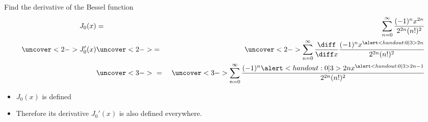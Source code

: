 \begin{frame}
\begin{example}[Example 4, p. 766]
Find the derivative of the Bessel function
\abovedisplayskip=0pt
\belowdisplayskip=0pt
\begin{eqnarray*}
J_0(x) & = & \sum_{n=0}^\infty \frac{(-1)^n x^{2n}}{2^{2n}(n!)^2}\\%
\uncover<2->{%
J_0'(x)%
}%
 & \uncover<2->{ = } &%
\uncover<2->{%
\sum_{n=0}^\infty \frac{\diff}{\diff x} \frac{(-1)^n x^{\alert<handout:0| 3>{2n}}}{2^{2n}(n!)^2}%
}\\%
 & \uncover<3->{\  = \ } &%
\uncover<3->{%
\sum_{n=0}^\infty \frac{(-1)^n \alert<handout:0| 3>{2n}x^{\alert<handout:0| 3>{2n-1}}}{2^{2n}(n!)^2}%
}%
\end{eqnarray*}
\begin{itemize}
\item<4-| alert@4-5>  $J_0(x)$ is defined 
\item<6->  Therefore its derivative $J_0'(x)$ is also defined everywhere.
\end{itemize}
\end{example}
\end{frame}
